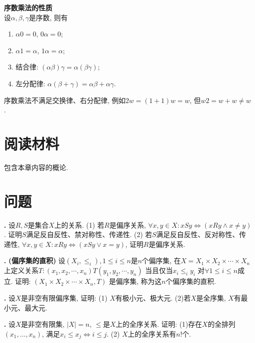 \begin{pro}\textbf{序数乘法的性质}\\
设$\alpha,\beta, \gamma$是序数, 则有
\begin{enumerate}
\item $\alpha 0=0$, $0\alpha =0$;
\item $\alpha 1=\alpha$, $1\alpha =\alpha$;
\item 结合律: $(\alpha\beta)\gamma=\alpha(\beta\gamma)$;
\item 左分配律: $\alpha(\beta+\gamma)=\alpha\beta+\alpha\gamma$.
\end{enumerate}
\end{pro}
序数乘法不满足交换律、右分配律, 例如$2w=(1+1)w=w$, 但$w2=w+w\neq w$. 

\section*{阅读材料}
\par \cite{NST}包含本章内容的概论.

\section*{问题}

\par \textbf{\theprobpar .} 设$R, S$是集合$X$上的关系. (1) 若$R$是偏序关系, $\forall x,y\in X: xSy \iff (xRy \land x\neq y)$. 证明$S$满足反自反性、禁对称性、传递性. (2) 若$S$满足反自反性、反对称性、传递性, $\forall x,y\in X: xRy \iff (xSy \lor x=y)$, 证明$R$是偏序关系. 

\par \textbf{\theprobpar .} \textbf{(偏序集的直积)} 设$(X_i,\le_i),1\le i\le n$是$n$个偏序集, 在$X=X_1\times X_2 \times \cdots\times X_n$上定义关系$T:(x_1,x_2,\cdots,x_n)T(y_1,y_2,\cdots,y_n)$ 当且仅当$x_i\le_i y_i$ 对$\forall 1\le i\le n$成立. 证明: $(X_1\times X_2 \times \cdots\times X_n, T)$ 是偏序集, 称为这$n$个偏序集的直积.

\par \textbf{\theprobpar .} 设$X$是非空有限偏序集, 证明: (1) $X$有极小元、极大元. (2)若$X$是全序集, $X$有最小元、最大元. 

\par \textbf{\theprobpar .} 设$X$是非空有限集, $|X|=n$, $\le$是$X$上的全序关系. 证明: (1)存在$X$的全排列$(x_1,\dots,x_n)$, 满足$x_i\le x_j \iff i\le j$. (2) $X$上的全序关系有$n!$个. 

